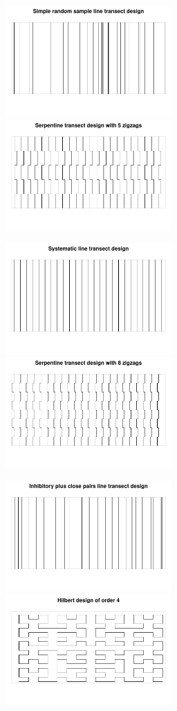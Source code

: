 \documentclass[review]{elsarticle}
\begin{document}
\begin{figure}
\includegraphics[width=2.5in]{SRS000176.pdf}
\includegraphics[width=2.5in]{Serp000124.pdf}

\includegraphics[width=2.5in]{Sys000141.pdf}
\includegraphics[width=2.5in]{Serp000539.pdf}

\includegraphics[width=2.5in]{Inhib000171.pdf}
\includegraphics[width=2.5in]{Hilbert000180.pdf}


\end{figure}
\end{document}
